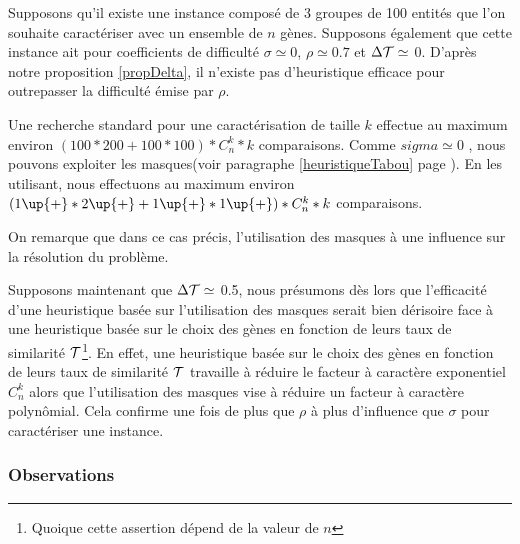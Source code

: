 \begin{exemple}
\label{exempleDifficulté}
Supposons qu'il existe une instance composé de 3 groupes de 100 entités que l'on souhaite caractériser avec un ensemble de $n$ gènes. Supposons également que cette instance ait pour coefficients de difficulté $\sigma \simeq 0$, $\rho \simeq 0.7$ et $\Delta\cal{T} \simeq$ 0. D'après notre proposition \ref{propDelta}, il n'existe pas d'heuristique efficace pour outrepasser la difficulté émise par $\rho$.

Une recherche standard pour une caractérisation de taille $k$ effectue au maximum environ $ (100*200 + 100*100) * C_n^k * k$ comparaisons. Comme $sigma \simeq 0$ , nous pouvons exploiter les masques(voir paragraphe \ref{heuristiqueTabou} page \pageref{heuristiqueTabou}). En les utilisant, nous effectuons au maximum environ $ (1\up{+} * 2\up{+} + 1\up{+}*1\up{+}) * C_n^k * k $ comparaisons.

On remarque que dans ce cas précis, l'utilisation des masques à une influence sur la résolution du problème.

Supposons maintenant que $\Delta\cal{T} \simeq $ 0.5, nous présumons dès lors que l'efficacité d'une heuristique basée sur l'utilisation des masques serait bien dérisoire face à une heuristique basée sur le choix des gènes en fonction de leurs taux de similarité $\cal{T}$\footnote{Quoique cette assertion dépend de la valeur de $n$}. En effet, une heuristique basée sur le choix des gènes en fonction de leurs taux de similarité $\cal{T}$ travaille à réduire le facteur à caractère exponentiel $C_n^k$ alors que l'utilisation des masques vise à réduire un facteur à caractère polynômial. Cela confirme une fois de plus que $\rho$ à plus d'influence que $\sigma$ pour caractériser une instance.
\end{exemple}



\subsubsection{Observations}

